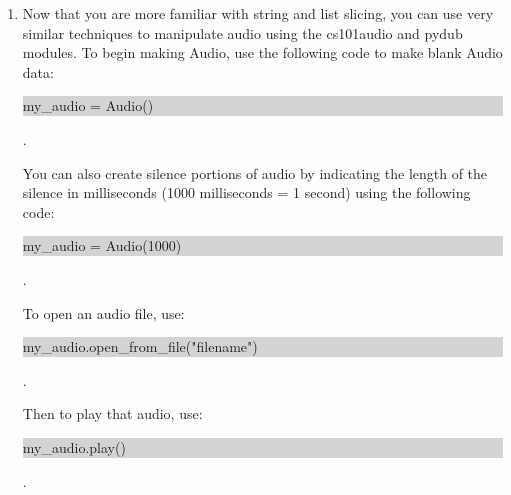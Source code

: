 \documentclass[11pt, letterpaper, onecolumn, oneside, final]{article}
\begin{document}
\begin{enumerate}
\item Now that you are more familiar with string and list slicing, you can use very similar techniques to manipulate audio using the {\consolas cs101audio} and {\consolas pydub} modules. To begin making Audio, use the following code to make blank Audio data:
\begin{center}
    \colorbox{lightgray}{\parbox{.23\textwidth}{\consolas my\_audio = Audio()}}.
\end{center}
You can also create silence portions of audio by indicating the length of the silence in milliseconds (1000 milliseconds = 1 second) using the following code:
\begin{center}
  \colorbox{lightgray}{\parbox{.275\textwidth}{\consolas my\_audio = Audio(1000)}}.
\end{center}
To open an audio file, use:
\begin{center}
\colorbox{lightgray}{\parbox{.45\textwidth}{\consolas my\_audio.open\_from\_file("filename")}}.
\end{center}
Then to play that audio, use:
\begin{center}
\colorbox{lightgray}{\parbox{.19\textwidth}{\consolas my\_audio.play()}}.
\end{center}
    

\end{enumerate}
\end{document}
